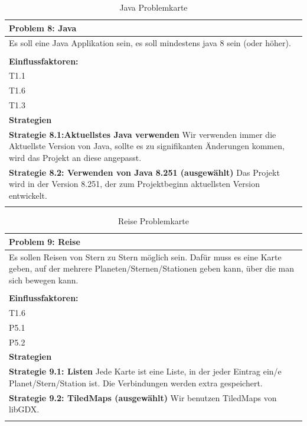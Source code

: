\documentclass[fontsize=12pt,paper=a4,twoside]{scrartcl}
\begin{document}
\begin{table}[H]
    \centering
    \begin{tabular}{|p{15cm}|}
    \hline
          \textbf{Problem 8: Java}  \\ \hline
	Es soll eine Java Applikation sein, es soll mindestens java 8 sein (oder höher). \\
         \\ \hline
          \textbf{Einflussfaktoren: } \\
	T1.1 \\
	T1.6 \\
	T1.3 \\
          \hline
          \textbf{Strategien} \\ \hline
            {}          
           \label{strategie:8.1}     
          \textbf{Strategie 8.1:Aktuellstes Java verwenden} Wir verwenden immer die Aktuellste Version von Java, sollte es zu signifikanten Änderungen kommen, wird das Projekt an diese angepasst.\\        
  {}          
           \label{strategie:8.2}              
          \textbf{Strategie 8.2: Verwenden von Java 8.251 (ausgewählt)} Das Projekt wird in der Version 8.251, der zum Projektbeginn aktuellsten Version entwickelt. \\
	 \\ \hline
    \end{tabular}

    \caption{Java Problemkarte}
    \label{tab:ProblemKarte8}
\end{table}

\begin{table}[H]
    \centering
    \begin{tabular}{|p{15cm}|}
    \hline
          \textbf{Problem 9: Reise}  \\ \hline
	Es sollen Reisen von Stern zu Stern möglich sein. Dafür muss es eine Karte geben, auf der mehrere Planeten/Sternen/Stationen geben kann, über die man sich bewegen kann. \\
         \\ \hline
          \textbf{Einflussfaktoren: } \\
	T1.6 \\
	P5.1 \\
	P5.2 \\
          \hline
          \textbf{Strategien} \\ \hline
            {}          
           \label{strategie:9.1}     
          \textbf{Strategie 9.1: Listen} Jede Karte ist eine Liste, in der jeder Eintrag ein/e Planet/Stern/Station ist. Die Verbindungen werden extra gespeichert.  \\        
  {}          
           \label{strategie:9.2}              
          \textbf{Strategie 9.2: TiledMaps  (ausgewählt)} Wir benutzen TiledMaps von libGDX.  \\
	 \\ \hline
    \end{tabular}

    \caption{Reise Problemkarte}
    \label{tab:ProblemKarte9}
\end{table}
\end{document}
